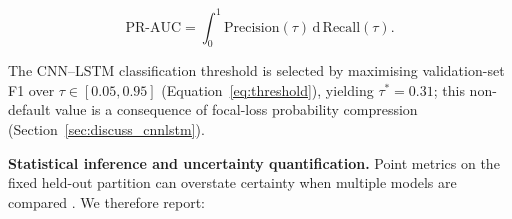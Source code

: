 \documentclass[sensors,article,submit,pdftex,moreauthors]{Definitions/mdpi}
\begin{document}
\begin{linenomath}
\begin{equation}
\text{PR-AUC} = \int_0^1 \text{Precision}(\tau)\,
  \mathrm{d}\,\text{Recall}(\tau).
\label{eq:prauc}
\end{equation}
\end{linenomath}

The CNN--LSTM classification threshold is selected by maximising
validation-set F1 over $\tau \in [0.05, 0.95]$
(Equation~\ref{eq:threshold}), yielding $\tau^* = 0.31$; this
non-default value is a consequence of focal-loss probability
compression (Section~\ref{sec:discuss_cnnlstm}).

\textbf{Statistical inference and uncertainty quantification.}
Point metrics on the fixed held-out partition can overstate certainty
when multiple models are compared \citep{ref-stat-tests-ml2006}.
We therefore report:
\end{document}
